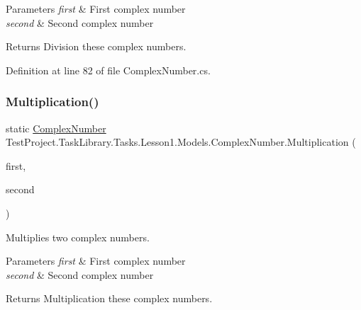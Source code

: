 \begin{DoxyParams}{Parameters}
{\em first} & First complex number\\
\hline
{\em second} & Second complex number\\
\hline
\end{DoxyParams}
\begin{DoxyReturn}{Returns}
Division these complex numbers.
\end{DoxyReturn}


Definition at line 82 of file Complex\+Number.\+cs.

\mbox{\label{class_test_project_1_1_task_library_1_1_tasks_1_1_lesson1_1_1_models_1_1_complex_number_ab2f7c9ab46279b073a72c40867536d8d}} 
\subsubsection{\texorpdfstring{Multiplication()}{Multiplication()}}
{\footnotesize\ttfamily static \mbox{\hyperlink{class_test_project_1_1_task_library_1_1_tasks_1_1_lesson1_1_1_models_1_1_complex_number}{Complex\+Number}} Test\+Project.\+Task\+Library.\+Tasks.\+Lesson1.\+Models.\+Complex\+Number.\+Multiplication (\begin{DoxyParamCaption}\item[{\mbox{\hyperlink{class_test_project_1_1_task_library_1_1_tasks_1_1_lesson1_1_1_models_1_1_complex_number}{Complex\+Number}}}]{first,  }\item[{\mbox{\hyperlink{class_test_project_1_1_task_library_1_1_tasks_1_1_lesson1_1_1_models_1_1_complex_number}{Complex\+Number}}}]{second }\end{DoxyParamCaption})\hspace{0.3cm}{\ttfamily [static]}}



Multiplies two complex numbers. 


\begin{DoxyParams}{Parameters}
{\em first} & First complex number\\
\hline
{\em second} & Second complex number\\
\hline
\end{DoxyParams}
\begin{DoxyReturn}{Returns}
Multiplication these complex numbers.
\end{DoxyReturn}


